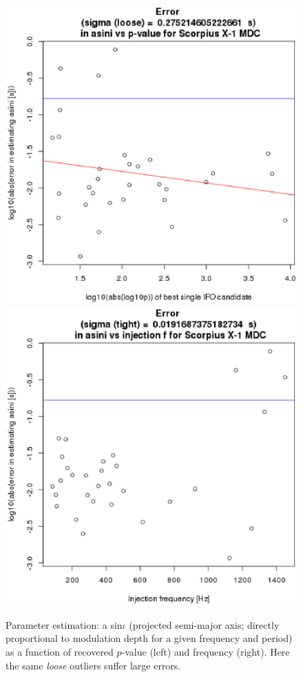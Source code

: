 \begin{figure}
\begin{center}
\includegraphics[width=0.3\paperwidth,height=0.2\paperheight]{ErrorAsini.eps}
\includegraphics[width=0.3\paperwidth,height=0.2\paperheight]{ErrorAsinivsF.eps}
\caption{Parameter estimation: a sin$\iota$ (projected semi-major axis; directly proportional to modulation depth for a given frequency and period) as a function of recovered $p$-value (left) and frequency (right).
Here the same \textit{loose} outliers suffer large errors.
}
\end{center}
\end{figure}


